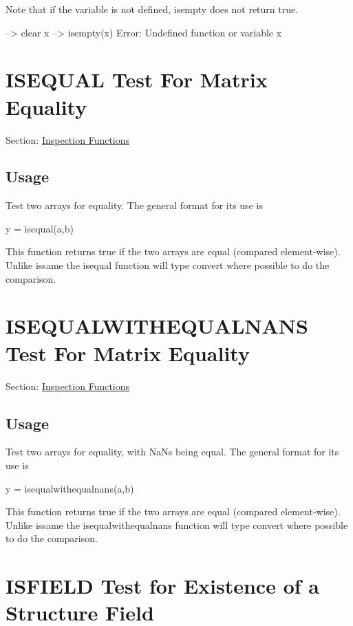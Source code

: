 Note that if the variable is not defined, {\ttfamily isempty} does not return true.


\begin{DoxyVerbInclude}
--> clear x
--> isempty(x)
Error: Undefined function or variable x
\end{DoxyVerbInclude}
 \hypertarget{inspection_isequal}{}\section{I\-S\-E\-Q\-U\-A\-L Test For Matrix Equality}\label{inspection_isequal}
Section\-: \hyperlink{sec_inspection}{Inspection Functions} \hypertarget{vtkwidgets_vtkxyplotwidget_Usage}{}\subsection{Usage}\label{vtkwidgets_vtkxyplotwidget_Usage}
Test two arrays for equality. The general format for its use is \begin{DoxyVerb}   y = isequal(a,b)
\end{DoxyVerb}
 This function returns true if the two arrays are equal (compared element-\/wise). Unlike {\ttfamily issame} the {\ttfamily isequal} function will type convert where possible to do the comparison. \hypertarget{inspection_isequalwithequalnans}{}\section{I\-S\-E\-Q\-U\-A\-L\-W\-I\-T\-H\-E\-Q\-U\-A\-L\-N\-A\-N\-S Test For Matrix Equality}\label{inspection_isequalwithequalnans}
Section\-: \hyperlink{sec_inspection}{Inspection Functions} \hypertarget{vtkwidgets_vtkxyplotwidget_Usage}{}\subsection{Usage}\label{vtkwidgets_vtkxyplotwidget_Usage}
Test two arrays for equality, with Na\-Ns being equal. The general format for its use is \begin{DoxyVerb}   y = isequalwithequalnans(a,b)
\end{DoxyVerb}
 This function returns true if the two arrays are equal (compared element-\/wise). Unlike {\ttfamily issame} the {\ttfamily isequalwithequalnans} function will type convert where possible to do the comparison. \hypertarget{inspection_isfield}{}\section{I\-S\-F\-I\-E\-L\-D Test for Existence of a Structure Field}\label{inspection_isfield}
